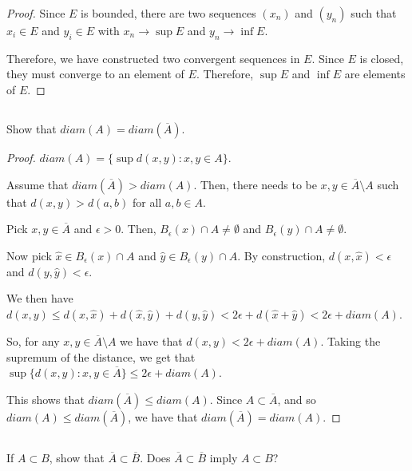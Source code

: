\begin{proof}
Since $E$ is bounded, there are two sequences $(x_n)$ and $(y_n)$ such that $x_i \in E$ and $y_i \in E$ with $x_n \rightarrow \sup E$ and $y_n \rightarrow \inf E$.

Therefore, we have constructed two convergent sequences in $E$. Since $E$ is closed, they must converge to an element of $E$. Therefore, $\sup E$ and $\inf E$ are elements of $E$.
\end{proof}

\subsection{} Show that $diam(A) = diam(\overline{A})$.

\begin{proof}
$diam(A) = \{\sup d(x,y) : x,y \in A\}$. 



Assume that $diam(\overline{A}) > diam(A)$. Then, there needs to be $x,y \in \overline{A} \setminus A$ such that $d(x,y) > d(a,b)$ for all $a,b \in A$.

Pick $x,y \in \overline{A}$ and $\epsilon > 0$. Then, $B_\epsilon(x) \cap A \neq \emptyset$ and $B_\epsilon(y) \cap A \neq \emptyset$.

Now pick $\hat{x} \in B_\epsilon(x) \cap A$ and $\hat{y} \in B_\epsilon(y) \cap A$. By construction, $d(x, \hat{x}) < \epsilon$ and $d(y, \hat{y}) < \epsilon$.

We then have $d(x,y) \leq d(x, \hat{x}) + d(\hat{x}, \hat{y}) + d(y, \hat{y}) < 2\epsilon + d(\hat{x} + \hat{y}) < 2\epsilon + diam(A)$.

So, for any $x, y \in \overline{A} \setminus A$ we have that $d(x,y) < 2\epsilon + diam(A)$. Taking the supremum of the distance, we get that $\sup\{d(x,y): x,y \in \overline{A}\} \leq 2\epsilon + diam(A)$. 

This shows that $diam(\overline{A}) \leq diam(A)$. Since $A \subset \overline{A}$, and so $diam(A) \leq diam(\overline{A})$, we have that $diam(\overline{A}) = diam(A)$.


\end{proof}

\subsection{} If $A \subset B$, show that $\overline{A} \subset \overline{B}$. Does $\overline{A} \subset \overline{B}$ imply $A \subset B$?

